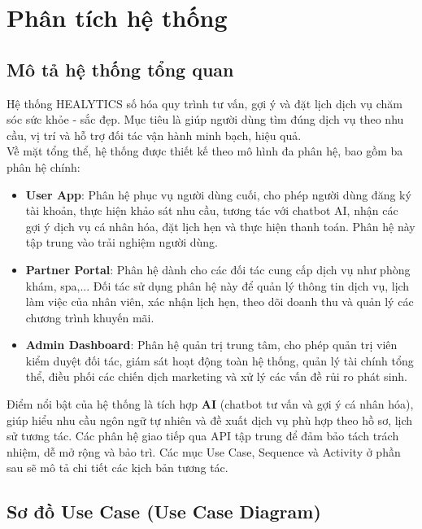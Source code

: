\chapter{Phân tích hệ thống}
\section{Mô tả hệ thống tổng quan}

Hệ thống HEALYTICS số hóa quy trình tư vấn, gợi ý và đặt lịch dịch vụ chăm sóc sức khỏe - sắc đẹp. Mục tiêu là giúp người dùng tìm đúng dịch vụ theo nhu cầu, vị trí và hỗ trợ đối tác vận hành minh bạch, hiệu quả. \\

Về mặt tổng thể, hệ thống được thiết kế theo mô hình đa phân hệ, bao gồm ba phân hệ chính: 

\begin{itemize}
    \item \textbf{User App}: Phân hệ phục vụ người dùng cuối, cho phép người dùng đăng ký tài khoản, thực hiện khảo sát nhu cầu, tương tác với chatbot AI, nhận các gợi ý dịch vụ cá nhân hóa, đặt lịch hẹn và thực hiện thanh toán. Phân hệ này tập trung vào trải nghiệm người dùng.
    
    \item \textbf{Partner Portal}: Phân hệ dành cho các đối tác cung cấp dịch vụ như phòng khám, spa,... Đối tác sử dụng phân hệ này để quản lý thông tin dịch vụ, lịch làm việc của nhân viên, xác nhận lịch hẹn, theo dõi doanh thu và quản lý các chương trình khuyến mãi.
    
    \item \textbf{Admin Dashboard}: Phân hệ quản trị trung tâm, cho phép quản trị viên kiểm duyệt đối tác, giám sát hoạt động toàn hệ thống, quản lý tài chính tổng thể, điều phối các chiến dịch marketing và xử lý các vấn đề rủi ro phát sinh.
\end{itemize}

Điểm nổi bật của hệ thống là tích hợp \textbf{AI} (chatbot tư vấn và gợi ý cá nhân hóa), giúp hiểu nhu cầu ngôn ngữ tự nhiên và đề xuất dịch vụ phù hợp theo hồ sơ, lịch sử tương tác. Các phân hệ giao tiếp qua API tập trung để đảm bảo tách trách nhiệm, dễ mở rộng và bảo trì. Các mục Use Case, Sequence và Activity ở phần sau sẽ mô tả chi tiết các kịch bản tương tác.
\section{Sơ đồ Use Case (Use Case Diagram)}

